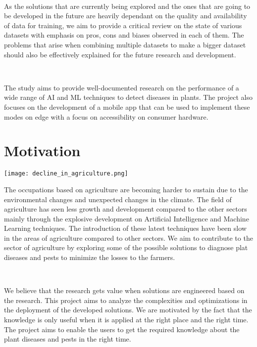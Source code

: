 \

As the solutions that are currently being explored and the ones that are going to be developed in the future are heavily dependant on the quality and availability of data for training, we aim to provide a critical review on the state of various datasets with emphasis on pros, cons and biases observed in each of them. The problems that arise when combining multiple datasets to make a bigger dataset should also be effectively explained for the future research and development.

\ 

The study aims to provide well-documented research on the performance of a wide range of AI and ML techniques to detect diseases in plants. The project also focuses on the development of a mobile app that can be used to implement these modes on edge with a focus on accessibility on consumer hardware.


\section{Motivation}

\begin{center}
    \texttt{[image: decline\_in\_agriculture.png]}\\
\end{center}



The occupations based on agriculture are becoming harder to sustain due to the environmental changes and unexpected changes in the climate. The field of agriculture has seen less growth and development compared to the other sectors mainly through the explosive development on Artificial Intelligence and Machine Learning techniques. The introduction of these latest techniques have been slow in the areas of agriculture compared to other sectors. We aim to contribute to the sector of agriculture by exploring some of the possible solutions to diagnose plat diseases and pests to minimize the losses to the farmers.

\

We believe that the research gets value when solutions are engineered based on the research. This project aims to analyze the complexities and optimizations in the deployment of the developed solutions. We are motivated by the fact that the knowledge is only useful when it is applied at the right place and the right time. The project aims to enable the users to get the required knowledge about the plant diseases and pests in the right time.

